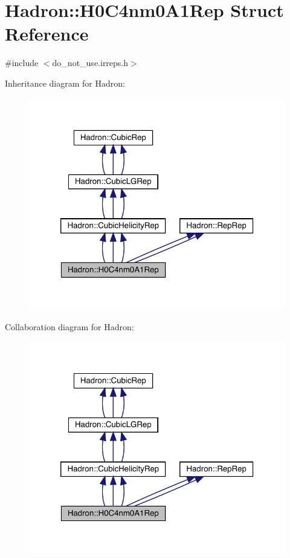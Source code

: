 \hypertarget{structHadron_1_1H0C4nm0A1Rep}{}\section{Hadron\+:\+:H0\+C4nm0\+A1\+Rep Struct Reference}
\label{structHadron_1_1H0C4nm0A1Rep}


{\ttfamily \#include $<$do\+\_\+not\+\_\+use.\+irreps.\+h$>$}



Inheritance diagram for Hadron\+:
\nopagebreak
\begin{figure}[H]
\begin{center}
\leavevmode
\includegraphics[width=320pt]{da/db9/structHadron_1_1H0C4nm0A1Rep__inherit__graph}
\end{center}
\end{figure}


Collaboration diagram for Hadron\+:
\nopagebreak
\begin{figure}[H]
\begin{center}
\leavevmode
\includegraphics[width=320pt]{dc/d8e/structHadron_1_1H0C4nm0A1Rep__coll__graph}
\end{center}
\end{figure}
